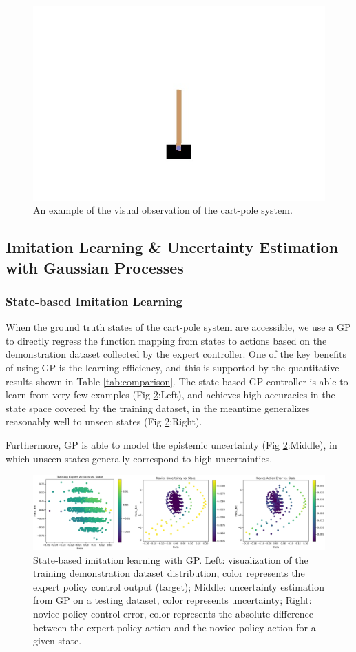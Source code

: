 \documentclass[11pt, reqno, letterpaper, twoside]{amsart}
\begin{document}
\begin{figure}[ht]
	\centering
	\includegraphics[width=0.5\linewidth]{imgs/random_rollout3.jpg}
	\caption{An example of the visual observation of the cart-pole system.}
	\label{fig:cart-pole}
\end{figure}

\subsection{Imitation Learning \& Uncertainty Estimation with Gaussian Processes}
\subsubsection{State-based Imitation Learning}
When the ground truth states of the cart-pole system are accessible, we use a GP
to directly regress the function mapping from states to actions based on the
demonstration dataset collected by the expert controller. One of the key
benefits of using GP is the learning efficiency, and this is supported by the
quantitative results shown in Table \ref{tab:comparison}. The state-based GP
controller is able to learn from very few examples (Fig
\ref{fig:state-il}:Left), and achieves high accuracies in the state space
covered by the training dataset, in the meantime generalizes reasonably well to
unseen states (Fig \ref{fig:state-il}:Right).

Furthermore, GP is able to model the epistemic uncertainty (Fig
\ref{fig:state-il}:Middle), in which unseen states generally correspond to high
uncertainties.

\begin{figure}[ht]
	\centering
	\includegraphics[width=\linewidth]{imgs/state-il.png}
	\caption{State-based imitation learning with GP. Left: visualization of the training demonstration dataset distribution, color represents the expert policy control output (target); Middle: uncertainty estimation from GP on a testing dataset, color represents uncertainty; Right: novice policy control error, color represents the absolute difference between the expert policy action and the novice policy action for a given state.}
	\label{fig:state-il}
\end{figure}
\end{document}
